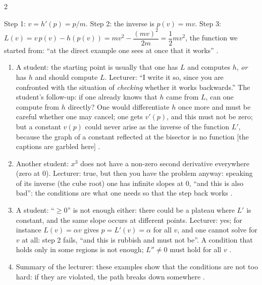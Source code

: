 \begin{paracol}{2}
\begin{example}[The back transformation of $h(p)=p^2/(2m)$]\label{ex:lt-back}
Step 1: $v=h'(p)=p/m$. Step 2: the inverse is $p(v)=mv$. Step 3: $L(v)=v\,p(v)-h(p(v))=mv^2-\dfrac{(mv)^2}{2m}=\dfrac12mv^2$, the function we started from: ``at the direct example one sees at once that it works'' .
\end{example}

\begin{coursenote}\label{cn:lt-questions}
\begin{enumerate}
  \item A student: the starting point is usually that one has $L$ and computes $h$, \emph{or} has $h$ and should compute $L$. Lecturer: ``I write it so, since you are confronted with the situation of \emph{checking} whether it works backwards.'' The student's follow-up: if one already knows that $h$ came from $L$, can one compute from $h$ directly? One would differentiate $h$ once more and must be careful whether one may cancel; one gets $v'(p)$, and this must not be zero; but a constant $v(p)$ could never arise as the inverse of the function $L'$, because the graph of a constant reflected at the bisector is no function [the captions are garbled here] .
  \item Another student: $x^3$ does not have a non-zero second derivative everywhere (zero at $0$). Lecturer: true, but then you have the problem anyway: speaking of its inverse (the cube root) one has infinite slopes at $0$, ``and this is also bad'': the conditions are what one needs so that the step back works .
  \item A student: ``$\geq0$'' is not enough either: there could be a plateau where $L'$ is constant, and the same slope occurs at different points. Lecturer: yes; for instance $L(v)=\alpha v$ gives $p=L'(v)=\alpha$ for all $v$, and one cannot solve for $v$ at all: step 2 fails, ``and this is rubbish and must not be''. A condition that holds only in some regions is not enough; $L''\neq0$ must hold for all $v$ .
  \item Summary of the lecturer: these examples show that the conditions are not too hard: if they are violated, the path breaks down somewhere .
\end{enumerate}
\end{coursenote}


\end{paracol}
